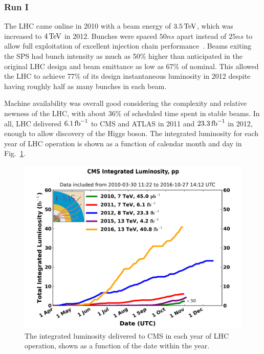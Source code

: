\subsubsection{Run I}
The LHC came online in 2010 with a beam energy of $3.5\,\mathrm{Te\hspace{-.08em}V}$, which was increased to $4\,\mathrm{Te\hspace{-.08em}V}$ in 2012.
Bunches were spaced $50\unit{ns}$ apart instead of $25\unit{ns}$ to allow full exploitation of excellent injection chain performance~\cite{1742-6596-455-1-012001}.
Beams exiting the SPS had bunch intensity as much as 50\% higher than anticipated in the original LHC design and beam emittance as low as 67\% of nominal.
This allowed the LHC to achieve 77\% of its design instantaneous luminosity in 2012 despite having roughly half as many bunches in each beam.

Machine availability was overall good considering the complexity and relative newness of the LHC, with about 36\% of scheduled time spent in stable beams.
In all, LHC delivered $6.1\mbox{\ensuremath{\,\mathrm{fb}^{-1}}}$ to CMS and ATLAS in 2011 and $23.3\mbox{\ensuremath{\,\mathrm{fb}^{-1}}}$ in 2012, enough to allow discovery of the Higgs boson.
The integrated luminosity for each year of LHC operation is shown as a function of calendar month and day in Fig.~\ref{fig:intLumi}.

\begin{figure}[htbp]
  \centering
  \includegraphics[width=.7\textwidth]{experiment/intLumi.png}
  \caption[Integrated luminosity delivered to CMS in each LHC run period]{
    The integrated luminosity delivered to CMS in each year of LHC operation, shown as a function of the date within the year.
  }\label{fig:intLumi}
\end{figure}


